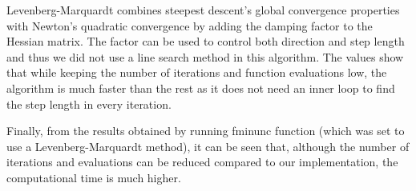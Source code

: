 Levenberg-Marquardt combines steepest descent's global convergence properties with Newton's quadratic convergence by adding the damping factor to the Hessian matrix. The factor can be used to control both direction and step length and thus we did not use a line search method in this algorithm. The values show that while keeping the number of iterations and function evaluations low, the algorithm is much faster than the rest as it does not need an inner loop to find the step length in every iteration.

Finally, from the results obtained by running fminunc function (which was set to use a Levenberg-Marquardt method), it can be seen that, although the number of iterations and evaluations can be reduced compared to our implementation, the computational time is much higher.